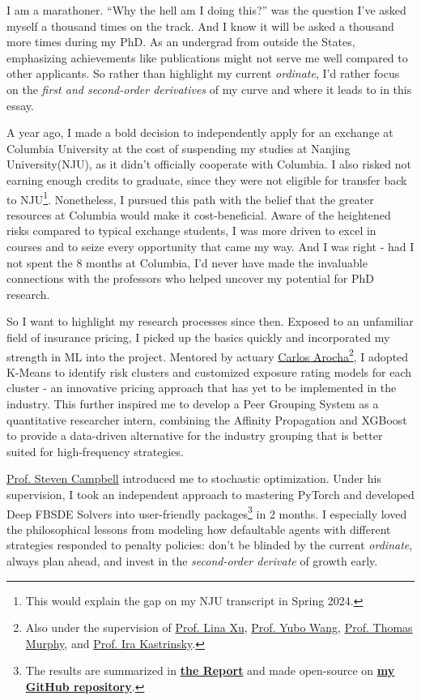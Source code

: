 \documentclass[12pt, a4paper]{article}
\newcommand{\Report}{\href{https://github.com/OrangeAoo/Multi-Compliance-MFG-FBSDEs/blob/ca6adb57636c1fc1ff9daea8d57f004e5762fd4d/FinalReports/Report-v3.pdf}{\textbf{the Report}}\xspace}
\newcommand{\GitHubMFG}{\href{https://github.com/OrangeAoo/Multi-Period-Compliance-MFG-FBSDEs}{\textbf{my GitHub repository}}\xspace}
\newcommand{\NJU}{Nanjing University\xspace}
\newcommand{\CU}{Columbia University\xspace}
\newcommand{\SC}{\href{https://www.stevenacampbell.com/}{Prof. Steven Campbell}\xspace}
\newcommand{\CA}{\href{https://www.linkedin.com/in/carocha/?originalSubdomain=ch}{Carlos Arocha}\xspace}
\newcommand{\LX}{\href{https://sps.columbia.edu/person/lina-xu}{Prof. Lina Xu}}
\newcommand{\YW}{\href{https://sps.columbia.edu/person/yubo-wang-phd}{Prof. Yubo Wang}\xspace}
\newcommand{\Tom}{\href{https://sps.columbia.edu/person/thomas-murphy}{Prof. Thomas Murphy}\xspace}
\newcommand{\Ira}{\href{https://sps.columbia.edu/person/ira-kastrinsky}{Prof. Ira Kastrinsky}\xspace}
\begin{document}
I am a marathoner. “Why the hell am I doing this?” was the question I’ve asked myself a thousand times on the track. And I know it will be asked a thousand more times during my PhD. As an undergrad from outside the States, emphasizing achievements like publications might not serve me well compared to other applicants. So rather than highlight my current \textit{ordinate}, I'd rather focus on the \textit{first and second-order derivatives} of my curve and where it leads to in this essay.

A year ago, I made a bold decision to independently apply for an exchange at \CU at the cost of suspending my studies at \NJU (NJU), as it didn't officially cooperate with Columbia. I also risked not earning enough credits to graduate, since they were not eligible for transfer back to NJU\footnote{This would explain the gap on my NJU transcript in Spring 2024.}. Nonetheless, I pursued this path with the belief that the greater resources at Columbia would make it cost-beneficial. Aware of the heightened risks compared to typical exchange students, I was more driven to excel in courses and to seize every opportunity that came my way. And I was right - had I not spent the 8 months at Columbia, I'd never have made the invaluable connections with the professors who helped uncover my potential for PhD research.

So I want to highlight my research processes since then. Exposed to an unfamiliar field of insurance pricing, I picked up the basics quickly and incorporated my strength in ML into the project. Mentored by actuary \CA\footnote{Also under the supervision of \LX, \YW, \Tom, and \Ira.}, I adopted K-Means to identify risk clusters and customized exposure rating models for each cluster - an innovative pricing approach that has yet to be implemented in the industry. This further inspired me to develop a Peer Grouping System as a quantitative researcher intern, combining the Affinity Propagation and XGBoost to provide a data-driven alternative for the industry grouping that is better suited for high-frequency strategies. 

\SC introduced me to stochastic optimization. Under his supervision, I took an independent approach to mastering PyTorch and developed Deep FBSDE Solvers into user-friendly packages\footnote{The results are summarized in \Report and made open-source on \GitHubMFG.} in 2 months. I especially loved the philosophical lessons from modeling how defaultable agents with different strategies responded to penalty policies: don't be blinded by the current \textit{ordinate}, always plan ahead, and invest in the \textit{second-order derivate} of growth early. 
\end{document}
